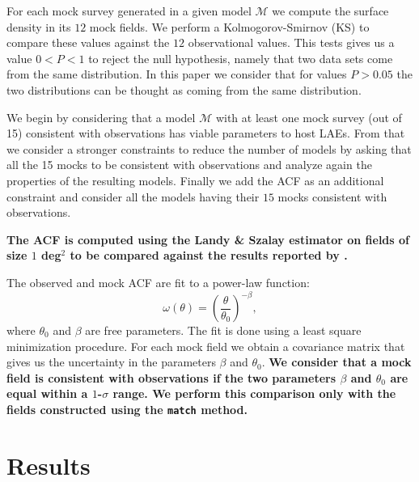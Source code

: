 \documentclass[usenatbib]{mn2e}
\begin{document}
For each mock survey generated in a given model ${\mathcal M}$ we
compute the surface density in its $12$ mock fields. We perform a
Kolmogorov-Smirnov (KS) to compare these values against the $12$
observational values. This tests gives us a value $0<P<1$ to
reject the null hypothesis, namely that two data sets come from the
same distribution. In this paper we consider that for values $P>0.05$
the two distributions can be thought as coming from the same
distribution.

We begin by considering that  a model ${\mathcal M}$ with at least one
mock survey (out of 15) consistent with observations has viable
parameters to host LAEs. From that we consider a stronger constraints
to reduce the number of models by asking that all the 15 mocks  to be
consistent with observations and analyze again the properties of the
resulting models. Finally we add the ACF as an additional constraint
and consider all the models having their $15$ mocks consistent with
observations. 

{\bf The ACF is computed using  the Landy \&  Szalay estimator
  \citep{Landy1993}  on fields of size $1$ deg$^2$ to be compared
  against the results reported by \cite{Ouchi2010}.}

The observed and mock ACF are fit to a power-law function:
\begin{equation}
\omega(\theta) = \left(\frac{\theta}{\theta_{0}}\right)^{-\beta}, 
\label{eq:fitting}
\end{equation}
where $\theta_0$ and $\beta$ are free parameters. The fit is done
using a least square minimization procedure. For each mock field we
obtain a covariance matrix that gives us the uncertainty in the
parameters $\beta$ and $\theta_0$. {\bf We consider that a mock field is
consistent with observations if the two parameters $\beta$ and
$\theta_0$ are equal within a $1$-$\sigma$ range. We perform this
comparison only with the fields constructed using the {\texttt{match}}
method.}
 
\section{Results}
\label{sec:results}
\end{document}
